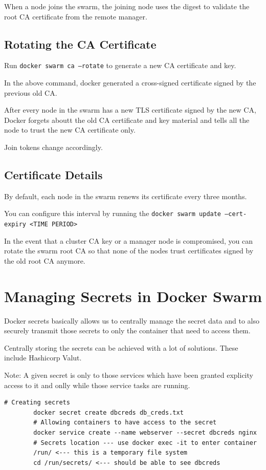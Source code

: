 \documentclass[11pt]{book}
\begin{document}
    When a node joins the swarm, the joining node uses the digest to validate the root CA certificate from the remote manager.

    \subsection{Rotating the CA Certificate}
    Run \texttt{docker swarm ca --rotate} to generate a new CA certificate and key.

    In the above command, docker generated a cross-signed certificate signed by the previous old CA.

    After every node in the swarm has a new TLS certificate signed by the new CA, Docker forgets aboutt the old CA certificate and key material and tells all the node to trust the new CA certificate only.

    Join tokens change accordingly.


    \subsection{Certificate Details}

    By default, each node in the swarm renews its certificate every three months.

    You can configure this interval by running the \texttt{docker swarm update --cert-expiry <TIME PERIOD>}

    In the event that a cluster CA key or a manager node is compromised, you can rotate the swarm root CA so that none of the nodes trust certificates signed by the old root CA anymore.


    \section{Managing Secrets in Docker Swarm}
    Docker secrets basically allows us to centrally manage the secret data and to also securely transmit those secrets to only the container that need to access them.

    Centrally storing the secrets can be achieved with a lot of solutions. These include Hashicorp Valut.

    Note: A given secret is only to those services which have been granted explicity access to it and onlly while those service tasks are running.

    \begin{lstlisting}[style=terminal]
        # Creating secrets
        docker secret create dbcreds db_creds.txt
        # Allowing containers to have access to the secret
        docker service create --name webserver --secret dbcreds nginx
        # Secrets location --- use docker exec -it to enter container
        /run/ <--- this is a temporary file system
        cd /run/secrets/ <--- should be able to see dbcreds
    \end{lstlisting}
\end{document}
